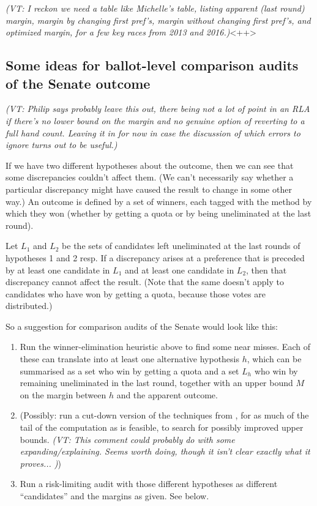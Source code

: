 \documentclass[10pt,a4paper]{article}
\newcommand{\VTNote}[1]{{\it(VT: #1)}}
\begin{document}
\VTNote{I reckon we need a table like Michelle's table, listing apparent (last round) margin, margin by changing first pref's, margin without changing first pref's, and optimized margin, for a few key races from 2013 and 2016.}<++>

\subsection{Some ideas for ballot-level comparison audits of the Senate outcome}
\VTNote{Philip says probably leave this out, there being not a lot of point in an RLA if there's no lower bound on the margin and no genuine option of reverting to a full hand count.  Leaving it in for now in case the discussion of which errors to ignore turns out to be useful.}

If we have two different hypotheses about the outcome, then we can see that some discrepancies couldn't affect them.  (We can't necessarily say whether a particular discrepancy might have caused the result to change in some other way.)  An outcome is defined by a set of winners, each tagged with the method by which they won (whether by getting a quota or by being uneliminated at the last round).

Let $L_1$ and $L_2$ be the sets of candidates left uneliminated at the last rounds of hypotheses 1 and 2 resp.  If a discrepancy arises at a preference that is preceded by at least one candidate in $L_1$ and at least one candidate in $L_2$, then that discrepancy cannot affect the result.  (Note that the same doesn't apply to candidates who have won by getting a quota, because those votes are distributed.)

So a suggestion for comparison audits of the Senate would look like this:
\begin{enumerate}
\item Run the winner-elimination heuristic above to find some near misses.  Each of these can translate into at least one alternative hypothesis $h$, which can be summarised as a set who win by getting a quota and a set $L_h$ who win by remaining uneliminated in the last round, together with an upper bound $M$ on the margin between $h$ and the apparent outcome.
\item (Possibly: run a cut-down version of the techniques from \cite{blom2015efficient}, for as much of the tail of the computation as is feasible, to search for possibly improved upper bounds.  \VTNote{This comment could probably do with some expanding/explaining.  Seems worth doing, though it isn't clear exactly what it proves...  })
\item Run a risk-limiting audit with those different hypotheses as different ``candidates'' and the margins as given.  See below. 
\end{enumerate}
\end{document}
